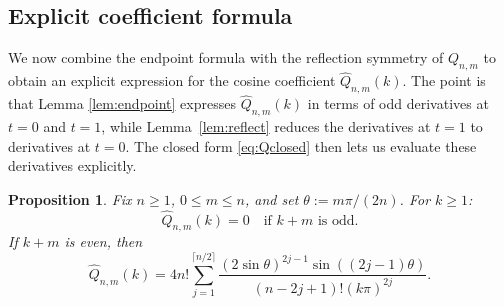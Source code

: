 \documentclass[a4paper,12pt]{amsart}
\newtheorem{proposition}[theorem]{Proposition}
\theoremstyle{definition}
\theoremstyle{remark}
\begin{document}
\subsection{Explicit coefficient formula}


We now combine the endpoint formula with the reflection symmetry of $Q_{n,m}$ to obtain an explicit expression for the cosine coefficient $\widehat Q_{n,m}(k)$. The point is that Lemma \ref{lem:endpoint} expresses $\widehat Q_{n,m}(k)$ in terms of odd derivatives at $t=0$ and $t=1$, while Lemma~\ref{lem:reflect} reduces the derivatives at $t=1$ to derivatives at $t=0$. The closed form \eqref{eq:Qclosed} then lets us evaluate these derivatives explicitly.


\begin{proposition}\label{prop:explicit}
Fix $n\ge1$, $0\le m\le n$, and set $\theta:=m\pi/(2n)$.
For $k\ge1$:
\[
\widehat Q_{n,m}(k)=0\quad\text{if }k+m\text{ is odd}.
\]
If $k+m$ is even, then
\begin{equation}\label{eq:explicit}
\widehat Q_{n,m}(k)
=4n!\sum_{j=1}^{\lceil n/2\rceil}
\frac{(2\sin\theta)^{2j-1}\sin((2j-1)\theta)}
{(n-2j+1)!(k\pi)^{2j}}.
\end{equation}
\end{proposition}
\end{document}
